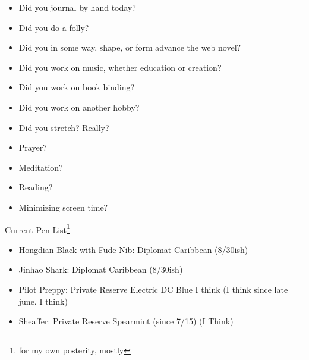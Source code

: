\documentclass[12pt]{article}
\renewcommand{\,}{\textsuperscript{,}}
\begin{document}
\begin{itemize}

\item Did you journal by hand today?

\item Did you do a folly?

\item Did you in some way, shape, or form advance the web novel?

\item Did you work on music, whether education or creation?

\item Did you work on book binding?

\item Did you work on another hobby?

\item Did you stretch? Really?

\item Prayer?

\item Meditation?

\item Reading?

\item Minimizing screen time?

\end{itemize}

Current Pen List\footnote{for my own posterity, mostly}

\begin{itemize}  
\item Hongdian Black with Fude Nib: Diplomat Caribbean (8/30ish)  
\item Jinhao Shark: Diplomat Caribbean (8/30ish)  
\item Pilot Preppy: Private Reserve Electric DC Blue I think (I think since late june. I think)  
\item Sheaffer: Private Reserve Spearmint (since 7/15) (I Think)
\end{itemize}
\end{document}
